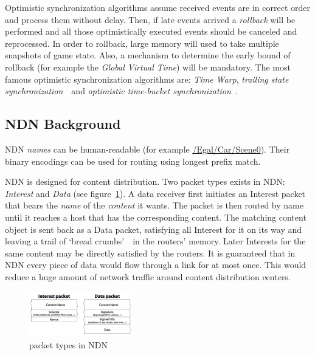 \documentclass{sigchi}
\begin{document}
Optimistic synchronization algorithms assume received events are in correct order and process them without delay. Then, if late events arrived a \emph{rollback} will be performed and all those optimistically executed events should be canceled and reprocessed. In order to rollback, large memory will used to take multiple snapshots of game state. Also, a mechanism to determine the early bound of rollback (for example the \emph{Global Virtual Time}) will be mandatory. The most famous optimistic synchronization algorithms are: \emph{Time Warp}, \emph{trailing state synchronization}~\cite{Csync}~and \emph{optimistic time-bucket synchronization}~\cite{Doptbkt}.

\subsection{NDN Background}
\label{ndnbg}

NDN \emph{names} can be human-readable (for example \url{/Egal/Car/Scene0}). Their binary encodings can be used for routing using longest prefix match.

NDN is designed for content distribution. Two packet types exists in NDN: \emph{Interest} and \emph{Data} (see figure~\ref{packet_types}). A data receiver first initiates an Interest packet that bears the \emph{name} of the \emph{content} it wants. The packet is then routed by name until it reaches a host that has the corresponding content. The matching content object is sent back as a Data packet, satisfying all Interest for it on its way and leaving a trail of `bread crumbs'~\cite{Jndn}~in the routers' memory. Later Interests for the same content may be directly satisfied by the routers. It is guaranteed that in NDN every piece of data would flow through a link for at most once. This would reduce a huge amount of network traffic around content distribution centers.

\begin{figure} 
\begin{center}
\includegraphics[width=0.4\textwidth] {image/packet_types}
\caption{packet types in NDN}
\label{packet_types}
\end{center}
\end{figure}
\end{document}
